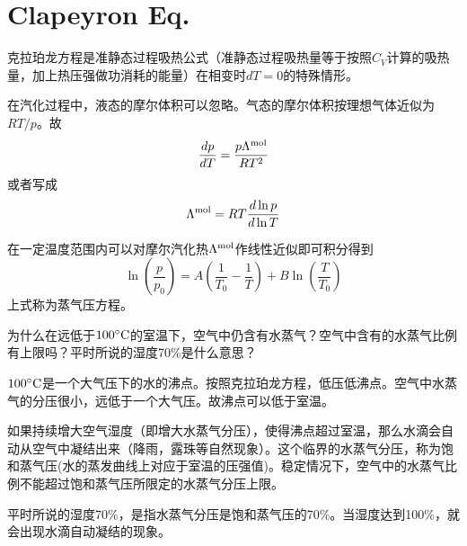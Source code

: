 \documentclass[CJK]{beamer}
\begin{document}
\section{Clapeyron Eq.}
\setcounter{chap}{5}
\setcounter{problem}{0}

\begin{frame}
  \bch
  \emini
  克拉珀龙方程是准静态过程吸热公式（准静态过程吸热量等于按照$C_V$计算的吸热量，加上热压强做功消耗的能量）在相变时$dT=0$的特殊情形。
  \emini
  
  \ech
\end{frame}

\begin{frame}
  \bch
  在汽化过程中，液态的摩尔体积可以忽略。气态的摩尔体积按理想气体近似为$RT/p$。故
  $$ \frac{dp}{dT} = \frac{p\Lambda^{\rm mol}}{RT^2}$$
  或者写成
{\blue  $$ \Lambda^{\rm mol} = RT \frac{d \ln p}{d \ln T} $$}
  \ech
\end{frame}


\begin{frame}
  \bch
  在一定温度范围内可以对摩尔汽化热$\Lambda^{\rm mol}$作线性近似即可积分得到
  $$\ln\left(\frac{p}{p_0}\right) = A\left(\frac{1}{T_0} - \frac{1}{T}\right) + B \ln\left(\frac{T}{T_0}\right)$$
  上式称为蒸气压方程。
  \ech
\end{frame}

\begin{frame}
  \chtitle{\proid (\sone)}
  \bch
  为什么在远低于$100^\circ \mathrm{C}$的室温下，空气中仍含有水蒸气？空气中含有的水蒸气比例有上限吗？平时所说的湿度70\%是什么意思？
  \ech
\end{frame}


\begin{frame}
  \bch
  $100^\circ \mathrm{C}$是一个大气压下的水的沸点。按照克拉珀龙方程，低压低沸点。空气中水蒸气的分压很小，远低于一个大气压。故沸点可以低于室温。

  \skipline

  如果持续增大空气湿度（即增大水蒸气分压），使得沸点超过室温，那么水滴会自动从空气中凝结出来（降雨，露珠等自然现象）。这个临界的水蒸气分压，称为饱和蒸气压(水的蒸发曲线上对应于室温的压强值)。稳定情况下，空气中的水蒸气比例不能超过饱和蒸气压所限定的水蒸气分压上限。

  \skipline
  
  平时所说的湿度70\%，是指水蒸气分压是饱和蒸气压的70\%。当湿度达到100\%，就会出现水滴自动凝结的现象。
  \ech
\end{frame}
\end{document}
